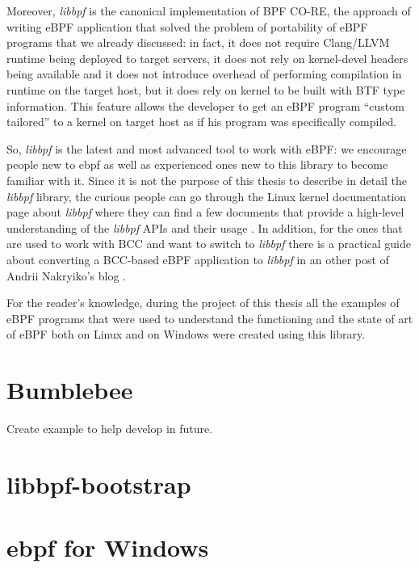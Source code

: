 Moreover, \textit{libbpf} is the canonical implementation of BPF CO-RE, the approach of writing eBPF application that solved the problem of portability of eBPF programs that we already discussed: in fact, it does not require Clang/LLVM runtime being deployed to target servers, it does not rely on kernel-devel headers being available and it does not introduce overhead of performing compilation in runtime on the target host, but it does rely on kernel to be built with BTF type information.
This feature allows the developer to get an eBPF program ``custom tailored'' to a kernel on target host as if his program was specifically compiled.

So, \textit{libbpf} is the latest and most advanced tool to work with eBPF: we encourage people new to ebpf as well as experienced ones new to this library to become familiar with it.
Since it is not the purpose of this thesis to describe in detail the \textit{libbpf} library, the curious people can go through the Linux kernel documentation page about \textit{libbpf} where they can find a few documents that provide a high-level understanding of the \textit{libbpf} APIs and their usage \cite{libbpfPageLinuxKernelDOc}.
In addition, for the ones that are used to work with BCC and want to switch to \textit{libbpf} there is a practical guide about converting a BCC-based eBPF application to \textit{libbpf} in an other post of Andrii Nakryiko's blog \cite{BCCTolibbpfGuide}.

For the reader's knowledge, during the project of this thesis all the examples of eBPF programs that were used to understand the functioning and the state of art of eBPF both on Linux and on Windows were created using this library.

\section{Bumblebee}


Create example to help develop in future.

\section{libbpf-bootstrap}



\section{ebpf for Windows}



